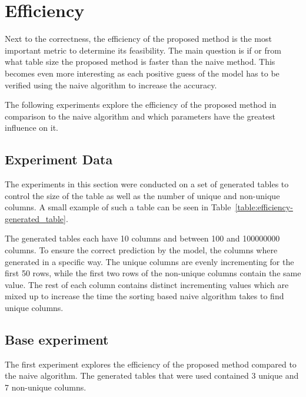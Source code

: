 \section{Efficiency}\label{sec:efficiency}
Next to the correctness, the efficiency of the proposed method is the most important metric to determine its feasibility. %
The main question is if or from what table size the proposed method is faster than the naive method. This becomes even more interesting as each positive guess of the model has to be verified using the naive algorithm to increase the accuracy. %

The following experiments explore the efficiency of the proposed method in comparison to the naive algorithm and which parameters have the greatest influence on it. %


\subsection{Experiment Data}\label{subsec:efficiency-experiment_data}
The experiments in this section were conducted on a set of generated tables to control the size of the table as well as the number of unique and non-unique columns. A small example of such a table can be seen in Table~\ref{table:efficiency-generated_table}. %

The generated tables each have \num{10} columns and between \num{100} and \num{100000000} columns. To ensure the correct prediction by the model, the columns where generated in a specific way.
The unique columns are evenly incrementing for the first \num{50} rows, while the first two rows of the non-unique columns contain the same value. The rest of each column contains distinct incrementing values which are mixed up to increase the time the sorting based naive algorithm takes to find unique columns. %




\subsection{Base experiment}\label{subsec:efficiency-base_experiment}
The first experiment explores the efficiency of the proposed method compared to the naive algorithm. The generated tables that were used contained \num{3} unique and \num{7} non-unique columns.  %

